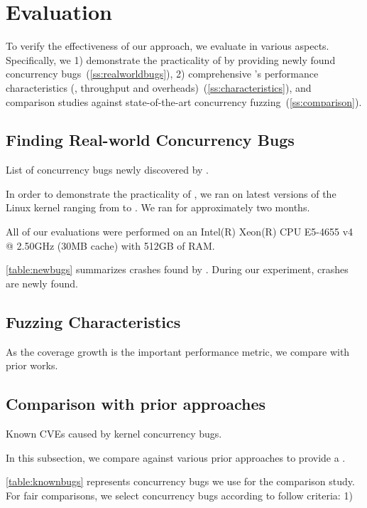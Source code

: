 \section{Evaluation}
\label{s:eval}

To verify the effectiveness of our approach, we evaluate \sys in
various aspects. Specifically, we 1) demonstrate the practicality of
\sys by providing newly found concurrency
bugs~(\autoref{ss:realworldbugs}), 2) comprehensive \sys's performance
characteristics (\eg, throughput and
overheads)~(\autoref{ss:characteristics}), and comparison studies
against state-of-the-art concurrency fuzzing~(\autoref{ss:comparison}).

\subsection{Finding Real-world Concurrency Bugs}
\label{ss:realworldbugs}

\begin{table}[t]
  
  \centering
  \caption{List of concurrency bugs newly discovered by \sys.}
  \label{table:newbugs}
\end{table}

In order to demonstrate the practicality of \sys, we ran \sys on
latest versions of the Linux kernel ranging from \XXX{} to \XXX{}.  We
ran \sys for approximately two months.

%
All of our evaluations were performed on an Intel(R) Xeon(R) CPU
E5-4655 v4 @ 2.50GHz (30MB cache) with 512GB of RAM.


%
\autoref{table:newbugs} summarizes crashes found by \sys. During our
experiment, \totalbugs crashes are newly found.
%






\subsection{Fuzzing Characteristics}
\label{ss:characteristics}

As the coverage growth is the important performance metric, we compare
\sys with prior works.




\subsection{Comparison with prior approaches}
\label{ss:comparison}

\begin{table}[t]
  
  \centering
  \caption{Known CVEs caused by kernel concurrency bugs.}
  \label{table:knownbugs}
\end{table}

In this subsection, we compare \sys against various prior approaches
to provide a .

%
\autoref{table:knownbugs} represents concurrency bugs we use for the
comparison study.
%
For fair comparisons, we select concurrency bugs according to follow
criteria: 1) 
%



